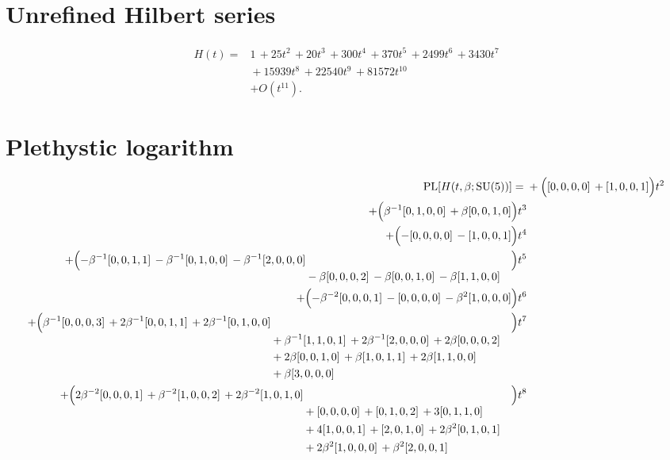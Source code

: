 \documentclass[10pt]{article}
\begin{document}
\section{Unrefined Hilbert series}
\[
\begin{aligned}
H(t) ={}& 1\,+25t^{2}\,+20t^{3}\,+300t^{4}\,+370t^{5}\,+2499t^{6}\,+3430t^{7} \\
  &{}+15939t^{8}\,+22540t^{9}\,+81572t^{10} \\
  &+ O(t^{11}).
\end{aligned}
\]

\section{Plethystic logarithm}
\[
\begin{aligned}
\operatorname{PL}[H(t,\beta;\mathrm{SU}(5))] ={}&
  + \Bigl([0,0,0,0]\,+[1,0,0,1]\Bigr)t^{2} \\
  + \Bigl(\beta^{-1}[0,1,0,0]\,+\beta[0,0,1,0]\Bigr)t^{3} \\
  + \Bigl(-[0,0,0,0]\,-[1,0,0,1]\Bigr)t^{4} \\
  + \Bigl(\begin{aligned}[t]-\beta^{-1}[0,0,1,1]\,-\beta^{-1}[0,1,0,0]\,-\beta^{-1}[2,0,0,0] \\
  &{}-\beta[0,0,0,2]\,-\beta[0,0,1,0]\,-\beta[1,1,0,0]\end{aligned}\Bigr)t^{5} \\
  + \Bigl(-\beta^{-2}[0,0,0,1]\,-[0,0,0,0]\,-\beta^{2}[1,0,0,0]\Bigr)t^{6} \\
  + \Bigl(\begin{aligned}[t]\beta^{-1}[0,0,0,3]\,+2\beta^{-1}[0,0,1,1]\,+2\beta^{-1}[0,1,0,0] \\
  &{}+\beta^{-1}[1,1,0,1]\,+2\beta^{-1}[2,0,0,0]\,+2\beta[0,0,0,2] \\
  &{}+2\beta[0,0,1,0]\,+\beta[1,0,1,1]\,+2\beta[1,1,0,0] \\
  &{}+\beta[3,0,0,0]\end{aligned}\Bigr)t^{7} \\
  + \Bigl(\begin{aligned}[t]2\beta^{-2}[0,0,0,1]\,+\beta^{-2}[1,0,0,2]\,+2\beta^{-2}[1,0,1,0] \\
  &{}+[0,0,0,0]\,+[0,1,0,2]\,+3[0,1,1,0] \\
  &{}+4[1,0,0,1]\,+[2,0,1,0]\,+2\beta^{2}[0,1,0,1] \\
  &{}+2\beta^{2}[1,0,0,0]\,+\beta^{2}[2,0,0,1]\end{aligned}\Bigr)t^{8} \\

\end{aligned}\]
\end{document}
